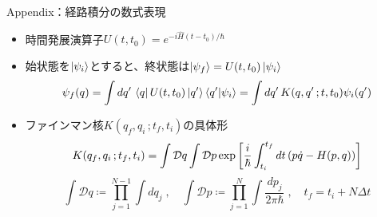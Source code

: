 \documentclass[14pt,aspectratio=169,xcolor=dvipsnames,table,dvipdfmx]{beamer}
\theoremstyle{definition}
\begin{document}
\appendix
\begin{frame}{Appendix：経路積分の数式表現}
  \begin{itemize}
    \item 時間発展演算子$U(t,t_0)=e^{-i\hat{H}(t-t_0)/\hbar}$
    \item 始状態を$\ket{\psi_i}$とすると、終状態は$\ket{\psi_f}=U(t,t_0)\ket{\psi_i}$
          \begin{equation*}
            \psi_f(q) = \int dq'\,\bra{q}U(t,t_0)\ket{q'}\bra{q'}\ket{\psi_i}
            = \int dq'\,K(q,q'\,;t,t_0)\psi_i(q')
          \end{equation*}
    \item ファインマン核$K(q_f,q_i\,;t_f,t_i)$の具体形
          \begin{equation*}
            K(q_f,q_i\,;t_f,t_i) = \int\mathcal{D}q\int\mathcal{D}p
            \exp\qty[\frac{i}{\hbar}\int_{t_i}^{t_f}dt\,(p\dot{q}-H(p,q))]
          \end{equation*}
          \begin{equation*}
            \int \mathcal{D}q \coloneqq \prod_{j=1}^{N-1} \int dq_j\;,\quad
            \int \mathcal{D}p \coloneqq \prod_{j=1}^N \int \frac{dp_j}{2\pi\hbar}\;,\quad
            t_f = t_i + N\varDelta t
          \end{equation*}
  \end{itemize}
\end{frame}
\end{document}
